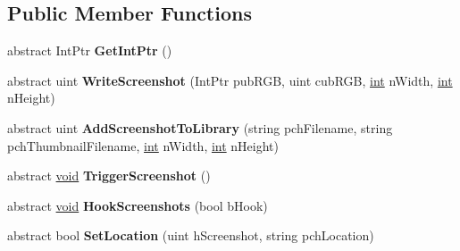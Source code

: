 \subsection*{Public Member Functions}
\begin{DoxyCompactItemize}
\item 
\hypertarget{classValve_1_1Steamworks_1_1ISteamScreenshots_a30cb9c9e22c0145ccb7e844b004c18ec}{}abstract Int\+Ptr {\bfseries Get\+Int\+Ptr} ()\label{classValve_1_1Steamworks_1_1ISteamScreenshots_a30cb9c9e22c0145ccb7e844b004c18ec}

\item 
\hypertarget{classValve_1_1Steamworks_1_1ISteamScreenshots_ab522b5bce4b593cb0e77fe62ab759d1d}{}abstract uint {\bfseries Write\+Screenshot} (Int\+Ptr pub\+R\+G\+B, uint cub\+R\+G\+B, \hyperlink{SDL__thread_8h_a6a64f9be4433e4de6e2f2f548cf3c08e}{int} n\+Width, \hyperlink{SDL__thread_8h_a6a64f9be4433e4de6e2f2f548cf3c08e}{int} n\+Height)\label{classValve_1_1Steamworks_1_1ISteamScreenshots_ab522b5bce4b593cb0e77fe62ab759d1d}

\item 
\hypertarget{classValve_1_1Steamworks_1_1ISteamScreenshots_a2fbefec332b225c85f389a4cfd94ec23}{}abstract uint {\bfseries Add\+Screenshot\+To\+Library} (string pch\+Filename, string pch\+Thumbnail\+Filename, \hyperlink{SDL__thread_8h_a6a64f9be4433e4de6e2f2f548cf3c08e}{int} n\+Width, \hyperlink{SDL__thread_8h_a6a64f9be4433e4de6e2f2f548cf3c08e}{int} n\+Height)\label{classValve_1_1Steamworks_1_1ISteamScreenshots_a2fbefec332b225c85f389a4cfd94ec23}

\item 
\hypertarget{classValve_1_1Steamworks_1_1ISteamScreenshots_a8f5a2618e93eae0a73c6daf1b9b2d812}{}abstract \hyperlink{SDL__audio_8h_a52835ae37c4bb905b903cbaf5d04b05f}{void} {\bfseries Trigger\+Screenshot} ()\label{classValve_1_1Steamworks_1_1ISteamScreenshots_a8f5a2618e93eae0a73c6daf1b9b2d812}

\item 
\hypertarget{classValve_1_1Steamworks_1_1ISteamScreenshots_a34e9b7f64677765b85f1f6199dd4da78}{}abstract \hyperlink{SDL__audio_8h_a52835ae37c4bb905b903cbaf5d04b05f}{void} {\bfseries Hook\+Screenshots} (bool b\+Hook)\label{classValve_1_1Steamworks_1_1ISteamScreenshots_a34e9b7f64677765b85f1f6199dd4da78}

\item 
\hypertarget{classValve_1_1Steamworks_1_1ISteamScreenshots_a5f6c64025fcc0917ce4699cd89fc93f1}{}abstract bool {\bfseries Set\+Location} (uint h\+Screenshot, string pch\+Location)\label{classValve_1_1Steamworks_1_1ISteamScreenshots_a5f6c64025fcc0917ce4699cd89fc93f1}


\end{DoxyCompactItemize}
